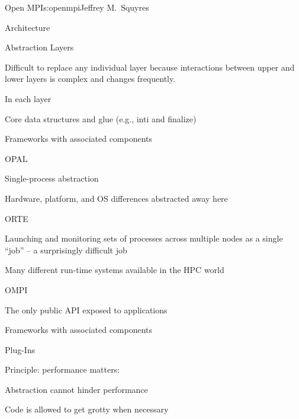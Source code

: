 \begin{aosachapter}{Open MPI}{s:openmpi}{Jeffrey M.\ Squyres}
\begin{aosasect1}{Architecture}
\begin{aosasect2}{Abstraction Layers}
\begin{aosaitemize}
\item Difficult to replace any individual layer because interactions
  between upper and lower layers is complex and changes frequently.

\item In each layer
  \begin{aosaitemize}
  \item Core data structures and glue (e.g., inti and finalize)
  \item Frameworks with associated components
  \end{aosaitemize}

\item OPAL
  \begin{aosaitemize}
  \item Single-process abstraction
  \item Hardware, platform, and OS differences abstracted away here
  \end{aosaitemize}

\item ORTE
  \begin{aosaitemize}
  \item Launching and monitoring sets of processes across multiple
    nodes as a single ``job'' -- a surprisingly difficult job
  \item Many different run-time systems available in the HPC world
  \end{aosaitemize}

\item OMPI
  \begin{aosaitemize}
  \item The only public API exposed to applications
  \item Frameworks with associated components
  \end{aosaitemize}
\end{aosaitemize}

\end{aosasect2}


\begin{aosasect2}{Plug-Ins}

\begin{aosaitemize}
\item Principle: performance matters:
  \begin{aosaitemize}
  \item Abstraction cannot hinder performance
  \item Code is allowed to get grotty when necessary
  \end{aosaitemize}


\end{aosaitemize}
\end{aosasect2}
\end{aosasect1}
\end{aosachapter}
